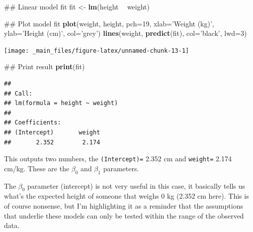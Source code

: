 \documentclass[]{book}
\newenvironment{Shaded}{\begin{snugshade}}{\end{snugshade}}
\newcommand{\KeywordTok}[1]{\textcolor[rgb]{0.13,0.29,0.53}{\textbf{#1}}}
\newcommand{\DataTypeTok}[1]{\textcolor[rgb]{0.13,0.29,0.53}{#1}}
\newcommand{\DecValTok}[1]{\textcolor[rgb]{0.00,0.00,0.81}{#1}}
\newcommand{\StringTok}[1]{\textcolor[rgb]{0.31,0.60,0.02}{#1}}
\newcommand{\OperatorTok}[1]{\textcolor[rgb]{0.81,0.36,0.00}{\textbf{#1}}}
\newcommand{\NormalTok}[1]{#1}
\theoremstyle{definition}
\theoremstyle{definition}
\theoremstyle{definition}
\theoremstyle{remark}
\begin{document}
\begin{Shaded}
\begin{Highlighting}[]
\NormalTok{## Linear model fit}
\NormalTok{fit <-}\StringTok{ }\KeywordTok{lm}\NormalTok{(height }\OperatorTok{~}\StringTok{ }\NormalTok{weight)}

\NormalTok{## Plot model fit}
\KeywordTok{plot}\NormalTok{(weight, height, }\DataTypeTok{pch=}\DecValTok{19}\NormalTok{, }\DataTypeTok{xlab=}\StringTok{'Weight (kg)'}\NormalTok{, }\DataTypeTok{ylab=}\StringTok{'Height (cm)'}\NormalTok{, }\DataTypeTok{col=}\StringTok{'grey'}\NormalTok{)}
\KeywordTok{lines}\NormalTok{(weight, }\KeywordTok{predict}\NormalTok{(fit), }\DataTypeTok{col=}\StringTok{'black'}\NormalTok{, }\DataTypeTok{lwd=}\DecValTok{3}\NormalTok{)}
\end{Highlighting}
\end{Shaded}

\begin{center}\texttt{[image: \_main\_files/figure-latex/unnamed-chunk-13-1]} \end{center}

\begin{Shaded}
\begin{Highlighting}[]
\NormalTok{## Print result}
\KeywordTok{print}\NormalTok{(fit)}
\end{Highlighting}
\end{Shaded}

\begin{verbatim}
## 
## Call:
## lm(formula = height ~ weight)
## 
## Coefficients:
## (Intercept)       weight  
##       2.352        2.174
\end{verbatim}

This outputs two numbers, the \texttt{(Intercept)=} 2.352 cm and
\texttt{weight=} 2.174 cm/kg. These are the \(\beta_0\) and \(\beta_1\)
parameters.

The \(\beta_0\) parameter (intercept) is not very useful in this case,
it basically tells us what's the expected height of someone that weighs
0 kg (2.352 cm here). This is of course nonsense, but I'm highlighting
it as a reminder that the assumptions that underlie these models can
only be tested within the range of the observed data.
\end{document}
